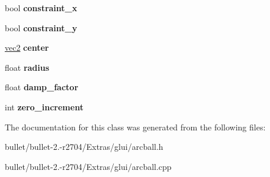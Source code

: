 \begin{DoxyCompactItemize}
\item 
\hypertarget{class_arcball_aaeed50eff2338720a5ccc6530e28e941}{bool {\bfseries constraint\+\_\+x}}\label{class_arcball_aaeed50eff2338720a5ccc6530e28e941}

\item 
\hypertarget{class_arcball_aa46718d1b438010622664c65f7412c2e}{bool {\bfseries constraint\+\_\+y}}\label{class_arcball_aa46718d1b438010622664c65f7412c2e}

\item 
\hypertarget{class_arcball_ac196c376b8f265704033938b0d6a7b6d}{\hyperlink{classvec2}{vec2} {\bfseries center}}\label{class_arcball_ac196c376b8f265704033938b0d6a7b6d}

\item 
\hypertarget{class_arcball_aed2e9c177c4f650e9aef6f3050972f6a}{float {\bfseries radius}}\label{class_arcball_aed2e9c177c4f650e9aef6f3050972f6a}

\item 
\hypertarget{class_arcball_a0b3b8f1e4f37e60ad3138ea41e0d0f13}{float {\bfseries damp\+\_\+factor}}\label{class_arcball_a0b3b8f1e4f37e60ad3138ea41e0d0f13}

\item 
\hypertarget{class_arcball_a5cb4b94f265115a4a60027071a123b8f}{int {\bfseries zero\+\_\+increment}}\label{class_arcball_a5cb4b94f265115a4a60027071a123b8f}

\end{DoxyCompactItemize}


The documentation for this class was generated from the following files\+:\begin{DoxyCompactItemize}
\item 
bullet/bullet-\/2.-\/r2704/\+Extras/glui/arcball.\+h\item 
bullet/bullet-\/2.-\/r2704/\+Extras/glui/arcball.\+cpp\end{DoxyCompactItemize}
